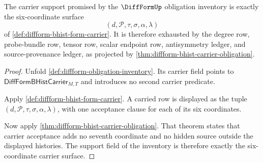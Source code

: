 \begin{theorem}
\label{thm:diffform-carrier-support-obligation}
The carrier support promised by the $\DiffFormUp$ obligation inventory is
exactly the six-coordinate surface
$$
(d,\mathcal{P},\tau,\sigma,\alpha,\lambda)
$$
of \autoref{def:diffform-bhist-form-carrier}. It is therefore exhausted by the
degree row, probe-bundle row, tensor row, scalar endpoint row, antisymmetry
ledger, and source-provenance ledger, as projected by
\autoref{thm:diffform-bhist-carrier-obligation}.
\end{theorem}
\begin{proof}
Unfold \autoref{def:diffform-obligation-inventory}. Its carrier field points
to $\mathsf{DiffFormBHistCarrier}_{M,T}$ and introduces no second carrier
predicate.

Apply \autoref{def:diffform-bhist-form-carrier}. A carried row is displayed as
the tuple $(d,\mathcal{P},\tau,\sigma,\alpha,\lambda)$, with one acceptance
clause for each of its six coordinates.

Now apply \autoref{thm:diffform-bhist-carrier-obligation}. That theorem
states that carrier acceptance adds no seventh coordinate and no hidden source
outside the displayed histories. The support field of the inventory is
therefore exactly the six-coordinate carrier surface.
\end{proof}

